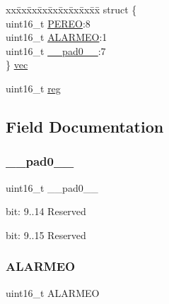 \begin{DoxyCompactItemize}
\begin{tabbing}
\end{tabbing}\item 
\begin{tabbing}
xx\=xx\=xx\=xx\=xx\=xx\=xx\=xx\=xx\=\kill
struct \{\\
\>uint16\_t \mbox{\hyperlink{union_r_t_c___m_o_d_e2___e_v_c_t_r_l___type_a936998d42a0d7673dd317bdd16f1f224}{PEREO}}:8\\
\>uint16\_t \mbox{\hyperlink{union_r_t_c___m_o_d_e2___e_v_c_t_r_l___type_af4a598b4e8f5a912d842b14d218d2ec6}{ALARMEO}}:1\\
\>uint16\_t \mbox{\hyperlink{union_r_t_c___m_o_d_e2___e_v_c_t_r_l___type_a77132c2c26a75f5b8751b235cda23828}{\_\_pad0\_\_}}:7\\
\} \mbox{\hyperlink{union_r_t_c___m_o_d_e2___e_v_c_t_r_l___type_ac64d504f5bc5bd75af796bee49ba21e4}{vec}}\\

\end{tabbing}\item 
uint16\+\_\+t \mbox{\hyperlink{union_r_t_c___m_o_d_e2___e_v_c_t_r_l___type_a11760f5020019f4aa8cb02e694f7cc44}{reg}}
\end{DoxyCompactItemize}


\subsection{Field Documentation}
\mbox{\label{union_r_t_c___m_o_d_e2___e_v_c_t_r_l___type_a77132c2c26a75f5b8751b235cda23828}} 
\subsubsection{\texorpdfstring{\_\_pad0\_\_}{\_\_pad0\_\_}}
{\footnotesize\ttfamily uint16\+\_\+t \+\_\+\+\_\+pad0\+\_\+\+\_\+}

bit\+: 9..14 Reserved

bit\+: 9..15 Reserved \mbox{\label{union_r_t_c___m_o_d_e2___e_v_c_t_r_l___type_af4a598b4e8f5a912d842b14d218d2ec6}} 
\subsubsection{\texorpdfstring{ALARMEO}{ALARMEO}}
{\footnotesize\ttfamily uint16\+\_\+t A\+L\+A\+R\+M\+EO}

